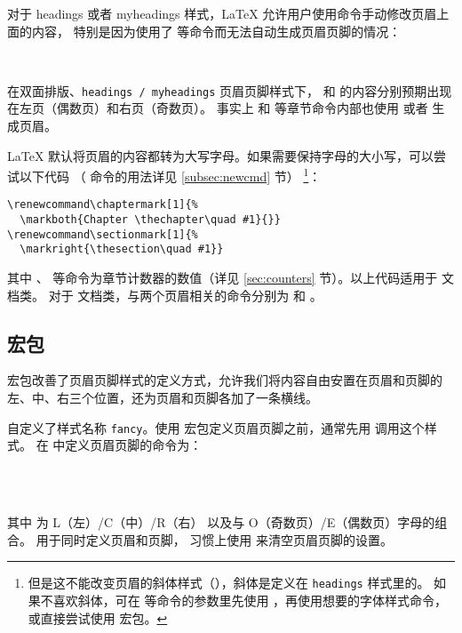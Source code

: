 对于 headings 或者 myheadings 样式，\LaTeX{} 允许用户使用命令手动修改页眉上面的内容，
特别是因为使用了  等命令而无法自动生成页眉页脚的情况：
\begin{command}
\\
\end{command}

在双面排版、\texttt{headings / myheadings} 页眉页脚样式下， 和  的内容分别预期出现在左页（偶数页）和右页（奇数页）。
事实上  和  等章节命令内部也使用  或者  生成页眉。

\LaTeX{} 默认将页眉的内容都转为大写字母。如果需要保持字母的大小写，可以尝试以下代码
（\cmd{\renewcommand} 命令的用法详见 \ref{subsec:newcmd} 节）%
\footnote{但是这不能改变页眉的斜体样式（），斜体是定义在 \texttt{headings} 样式里的。
如果不喜欢斜体，可在  等命令的参数里先使用 ，再使用想要的字体样式命令，
或直接尝试使用  宏包。}：
\begin{verbatim}
\renewcommand\chaptermark[1]{%
  \markboth{Chapter \thechapter\quad #1}{}}
\renewcommand\sectionmark[1]{%
  \markright{\thesection\quad #1}}
\end{verbatim}

其中 、 等命令为章节计数器的数值（详见 \ref{sec:counters} 节）。以上代码适用于  文档类。
对于  文档类，与两个页眉相关的命令分别为  和 。

\subsection{ 宏包}\label{subsec:fancyhdr}

 宏包改善了页眉页脚样式的定义方式，允许我们将内容自由安置在页眉和页脚的左、中、右三个位置，还为页眉和页脚各加了一条横线。

 自定义了样式名称 \texttt{fancy}。使用  宏包定义页眉页脚之前，通常先用  调用这个样式。
在  中定义页眉页脚的命令为：
\begin{command}
\marg*{\ldots}\\
\marg*{\ldots}\\
\marg*{\ldots}
\end{command}
其中  为 L（左）/C（中）/R（右） 以及与 O（奇数页）/E（偶数页）字母的组合。 用于同时定义页眉和页脚，
习惯上使用 \marg*{} 来清空页眉页脚的设置。

